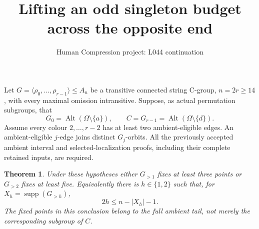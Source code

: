 \documentclass[11pt,a4paper]{article}
\title{Lifting an odd singleton budget across the opposite end}
\author{Human Compression project: L044 continuation}
\date{}
\newtheorem{theorem}{Theorem}
\newcommand{\gen}[1]{\langle#1\rangle}
\begin{document}
\maketitle
Let $G=\gen{\rho_0,\ldots,\rho_{r-1}}\le A_n$ be a transitive
connected string C-group, $n=2r\ge14$, with every maximal omission
intransitive. Suppose, as actual permutation subgroups, that
\[
 G_0=\operatorname{Alt}(\Omega\setminus\{a\}),\qquad
 C=G_{r-1}=\operatorname{Alt}(\Omega\setminus\{d\}).       \tag{1}
\]
Assume every colour $2,\ldots,r-2$ has at least two ambient-eligible
edges. An ambient-eligible $j$-edge joins distinct $G_j$-orbits.
All the previously accepted ambient interval and selected-localization
proofs, including their complete retained inputs, are required.

\begin{theorem}
Under these hypotheses either $G_{>1}$ fixes at least three points
or $G_{>2}$ fixes at least five. Equivalently there is $h\in\{1,2\}$
such that, for $X_h=\operatorname{supp}(G_{>h})$,
\[
                         2h\le n-|X_h|-1.              \tag{2}
\]
The fixed points in this conclusion belong to the full ambient tail,
not merely the corresponding subgroup of $C$.
\end{theorem}
\end{document}
